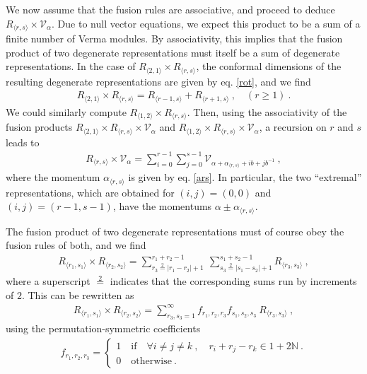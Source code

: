 \documentclass[12pt,a4paper,notitlepage]{report}
\numberwithin{equation}{section}
\theoremstyle{break}
\begin{document}
We now assume that the fusion rules are associative, and proceed to deduce $R_{\langle r,s \rangle}\times \mathcal{V}_\alpha$.
Due to null vector equations, we expect this product to be a sum of a finite number of Verma modules.
By associativity, this implies that the fusion product of two degenerate representations must itself be a sum of degenerate representations.
In the case of  
$R_{\langle 2,1\rangle}\times R_{\langle r,s\rangle}$, the conformal dimensions of the resulting degenerate representations are given by eq. \eqref{rot}, and we find
\begin{align}
R_{\langle 2,1\rangle}\times R_{\langle r,s\rangle} = R_{\langle r-1,s\rangle} + R_{\langle r+1,s\rangle }\ , \quad (r\geq 1)\ .
\end{align}
We could similarly compute $R_{\langle 1,2\rangle}\times R_{\langle r,s\rangle}$.
Then, using the associativity of the fusion products $R_{\langle 2,1\rangle}\times R_{\langle r,s\rangle}\times \mathcal{V}_\alpha$ and $R_{\langle 1,2\rangle}\times R_{\langle r,s\rangle}\times \mathcal{V}_\alpha$, a recursion on $r$ and $s$ leads to
\begin{align}
 \boxed{R_{\langle r,s \rangle}\times \mathcal{V}_\alpha = \sum_{i=0}^{r-1} \sum_{j=0}^{s-1} \mathcal{V}_{\alpha + \alpha_{\langle r,s \rangle}+ ib+jb^{-1}}}\ ,
\label{rtv}
\end{align}
where the momentum $\alpha_{\langle r,s \rangle}$ is given by eq. \eqref{ars}. 
In particular, the two ``extremal'' representations, which are obtained for $(i,j)=(0,0)$ and $(i,j)=(r-1,s-1)$, have the momentums
$\alpha \pm \alpha_{\langle r,s \rangle} $.

The fusion product of two degenerate representations must of course obey the fusion rules of both, and we find
\begin{align}
 \boxed{R_{\langle r_1,s_1 \rangle} \times R_{\langle r_2,s_2 \rangle} = \sum_{r_3\overset{2}{=}|r_1-r_2|+1}^{r_1+r_2-1}\ \sum_{s_3\overset{2}{=}|s_1-s_2|+1}^{s_1+s_2-1} R_{\langle r_3,s_3 \rangle}}\ ,
\label{rrsr}
\end{align}
where a superscript $\overset{2}{=}$ indicates that the corresponding sums run by increments of $2$.
This can be rewritten as 
\begin{align}
R_{\langle r_1,s_1 \rangle} \times R_{\langle r_2,s_2 \rangle} = \sum_{r_3,s_3=1}^\infty f_{r_1,r_2,r_3} f_{s_1,s_2,s_3}\ R_{\langle r_3,s_3 \rangle}\ ,
 \label{rrrsss}
\end{align}
using the permutation-symmetric coefficients
\begin{align}
f_{r_1,r_2,r_3} = \left\{\begin{array}{l}  1 \quad \text{if} \quad 
 \forall i\neq j\neq k \ , \quad r_i+r_j-r_k \in 1 + 2{\mathbb{N}}\ .
\\ 0 \quad \text{otherwise} \ .\end{array}\right.  
\label{frrr}
\end{align}
\end{document}
